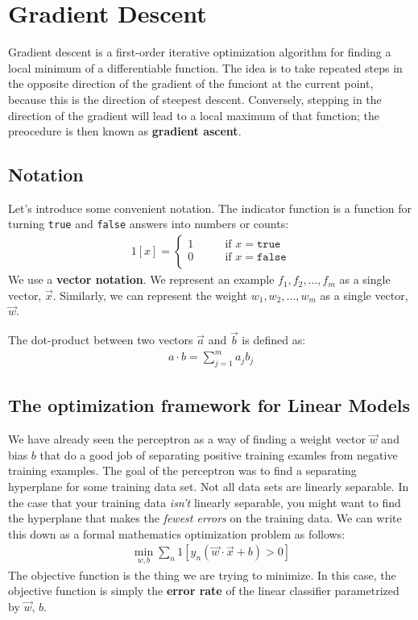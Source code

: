 \chapter{Gradient Descent}

Gradient descent is a first-order iterative optimization algorithm for finding a local minimum of a differentiable function. The idea is to take repeated steps in the opposite direction of the gradient of the funciont at the current point, because this is the direction of steepest descent. Conversely, stepping in the direction of the gradient will lead to a local maximum of that function; the preocedure is then known as \textbf{gradient ascent}.

\section{Notation}
Let's introduce some convenient notation. The indicator function is a function for turning \texttt{true} and \texttt{false} answers into numbers or counts:
\begin{align}
    1[x] = \begin{cases}
        1\qquad &\text{if }x=\texttt{true}\\
        0\qquad &\text{if }x=\texttt{false}\\
    \end{cases}
\end{align}
We use a \textbf{vector notation}. We represent an example \(f_1,f_2,...,f_m\) as a single vector, \(\vec{x}\). Similarly, we can represent the weight \(w_1,w_2,...,w_m\) as a single vector, \(\vec{w}\).

The dot-product between two vectors \(\vec{a}\) and \(\vec{b}\) is defined as:
\begin{align}
    a \cdot b = \sum_{j=1}^m a_jb_j
\end{align}

\section{The optimization framework for Linear Models}
We have already seen the perceptron as a way of finding a weight vector \(\vec{w}\) and bias \(b\) that do a good job of separating positive training examles from negative training examples. The goal of the perceptron was to find a separating hyperplane for some training data set. Not all data sets are linearly separable. In the case that your training data \emph{isn't} linearly separable, you might want to find the hyperplane that makes the \emph{fewest errors} on the training data. We can write this down as a formal mathematics optimization problem as follows:
\begin{align}
    \label{eqn:optimization}
    \min_{w,b} \sum_n 1[y_n(\vec{w} \cdot \vec{x} + b) > 0]
\end{align}
The objective function is the thing we are trying to minimize. In this case, the objective function is simply the \textbf{error rate} of the linear classifier parametrized by \(\vec{w}\), \(b\).

